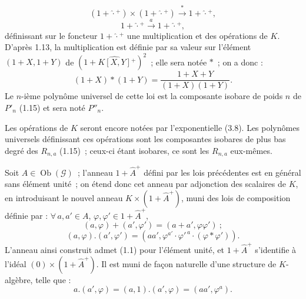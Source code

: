 \[
  (1+\widehat{\cdot}{}^{+})\times(1+\widehat{\cdot}{}^{+})\xrightarrow{\ \ast\ }1+\widehat{\cdot}{}^{+},
\]
\[
  1+\widehat{\cdot}{}^{+}\xrightarrow{\ a\ }1+\widehat{\cdot}{}^{+},
\]
définissant sur le foncteur \(1+\widehat{\cdot}{}^{+}\) une multiplication et des opérations de \(K\). D'après 1.13, la multiplication est définie par sa valeur sur l'élément \((1+X,1+Y)\) de \((1+\widehat{K[X,Y]}{}^{+})^{2}\)~; elle sera notée \(\ast\)~; on a donc :
\begin{equation}\tag{6.1.1}
  (1+X)\ast(1+Y)=\frac{1+X+Y}{(1+X)(1+Y)}.
\end{equation}
Le \(n\)-ième polynôme universel de cette loi est la composante isobare de poids \(n\) de \(P'_n\) (1.15) et sera noté \(P''_n\).

Les opérations de \(K\) seront encore notées par l'exponentielle (3.8). Les polynômes universels définissant ces opérations sont les composantes isobares de plus bas degré des \(R_{n,a}\) (1.15)~; ceux-ci étant isobares, ce sont les \(R_{n,a}\) eux-mêmes.

Soit \(A\in\operatorname{Ob}(\mathcal G)\)~; l'anneau \(1+\widehat A^{+}\) défini par les lois précédentes est en général sans élément unité~; on étend donc cet anneau par adjonction des scalaires de \(K\), en introduisant le nouvel anneau \(K\times(1+\widehat A^{+})\), muni des lois de composition définie par : \(\forall\,a,a'\in A\), \(\varphi,\varphi'\in1+\widehat A^{+}\),
\[
  (a,\varphi)+(a',\varphi')=(a+a',\varphi\varphi')~;
\]
\begin{equation}\tag{6.1.2}
  (a,\varphi).(a',\varphi')=(aa',\varphi^{a'}\cdot{\varphi'}^{\,a}\cdot(\varphi\ast\varphi')).
\end{equation}
L'anneau ainsi construit admet (1.1) pour l'élément unité, et \(1+\widehat A^{+}\) s'identifie à l'idéal \((0)\times(1+\widehat A^{+})\). Il est muni de façon naturelle d'une structure de \(K\)-algèbre, telle que :
\begin{equation}\tag{6.1.3}
  a.(a',\varphi)=(a,1).(a',\varphi)=(aa',\varphi^{a}).
\end{equation}

